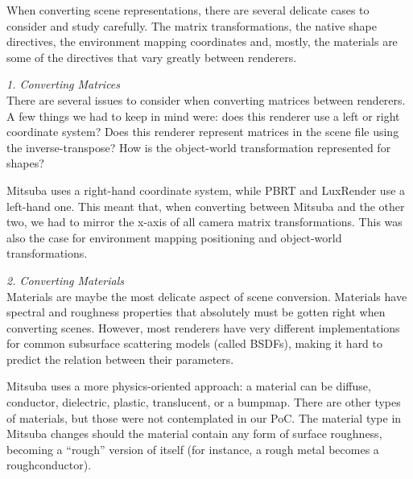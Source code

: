 When converting scene representations, there are several delicate cases to
consider and study carefully. The matrix transformations, the native shape
directives, the environment mapping coordinates and, mostly, the materials are
some of the directives that vary greatly between renderers. 

\textit{1. Converting Matrices} \\
There are several issues to consider when converting matrices between renderers.
A few things we had to keep in mind were: does this renderer use a left or right
coordinate system? Does this renderer represent matrices in the scene file using
the inverse-transpose? How is the object-world transformation represented for
shapes?

Mitsuba uses a right-hand coordinate system, while PBRT and LuxRender use a
left-hand one. This meant that, when converting between Mitsuba and the other
two, we had to mirror the x-axis of all camera matrix transformations. This was
also the case for environment mapping positioning and object-world
transformations.


\textit{2. Converting Materials} \\
Materials are maybe the most delicate aspect of scene conversion. Materials have
spectral and roughness properties that absolutely must be gotten right when
converting scenes. However, most renderers have very different implementations
for common subsurface scattering models (called BSDFs), making it hard to
predict the relation between their parameters.

Mitsuba uses a more physics-oriented approach: a material can be diffuse,
conductor, dielectric, plastic, translucent, or a bumpmap.
There are other types of materials, but those were not contemplated in our PoC.
The material type in Mitsuba changes should the material contain any form of
surface roughness, becoming a ``rough'' version of itself (for instance, a rough
metal becomes a roughconductor).

